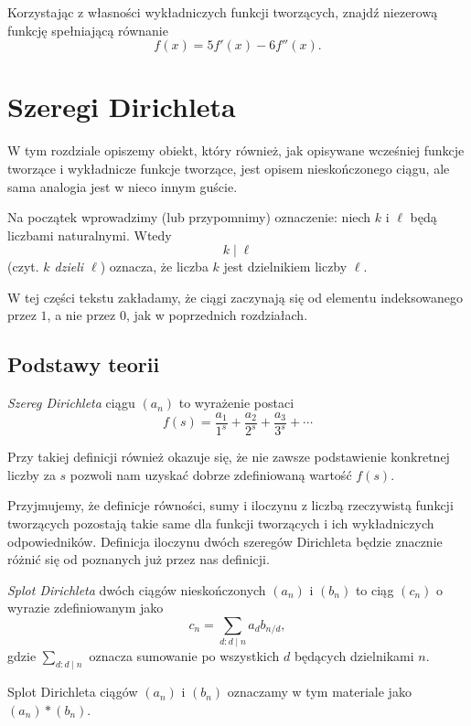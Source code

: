 \documentclass[shortabstract]{imthesis}
\begin{document}
\begin{problem} \label{problem:diffeq}
    Korzystając z własności wykładniczych funkcji tworzących, znajdź niezerową funkcję spełniającą równanie
    $$
    f(x) = 5f'(x) - 6f''(x).
    $$
\end{problem}

\chapter{Szeregi Dirichleta}

W tym rozdziale opiszemy obiekt, który również, jak opisywane wcześniej funkcje tworzące i wykładnicze funkcje tworzące, jest opisem nieskończonego ciągu, ale sama analogia jest w nieco innym guście.

Na początek wprowadzimy (lub przypomnimy) oznaczenie: niech $k$ i $\ell$ będą liczbami naturalnymi. Wtedy
$$
k \mid \ell
$$
(czyt. \emph{$k$ dzieli $\ell$}) oznacza, że liczba $k$ jest dzielnikiem liczby $\ell$.

W tej części tekstu zakładamy, że ciągi zaczynają się od elementu indeksowanego przez $1$, a nie przez $0$, jak w poprzednich rozdziałach.

\section{Podstawy teorii}

\begin{definition}
    \emph{Szereg Dirichleta} ciągu $(a_n)$ to wyrażenie postaci
    $$
    f(s) = \frac{a_1}{1^s} + \frac{a_2}{2^s} + \frac{a_3}{3^s} + \cdots
    $$
\end{definition}

Przy takiej definicji również okazuje się, że nie zawsze podstawienie konkretnej liczby za $s$ pozwoli nam uzyskać dobrze zdefiniowaną wartość $f(s)$.

Przyjmujemy, że definicje równości, sumy i iloczynu z liczbą rzeczywistą
funkcji tworzących pozostają takie same dla funkcji tworzących i ich wykładniczych odpowiedników. Definicja iloczynu dwóch szeregów Dirichleta będzie znacznie różnić się od poznanych już przez nas definicji.

\begin{definition} \label{def:dirichletconv}
    \emph{Splot Dirichleta} dwóch ciągów nieskończonych $(a_n)$ i $(b_n)$ to ciąg $(c_n)$ o wyrazie zdefiniowanym jako
    $$
    c_n = \sum_{d : d \mid n} a_d b_{n/d},
    $$
    gdzie $\sum_{d : d \mid n}$ oznacza sumowanie po wszystkich $d$ będących dzielnikami $n$.
    
    Splot Dirichleta ciągów $(a_n)$ i $(b_n)$ oznaczamy w tym materiale jako $(a_n) * (b_n)$.
\end{definition}
\end{document}
